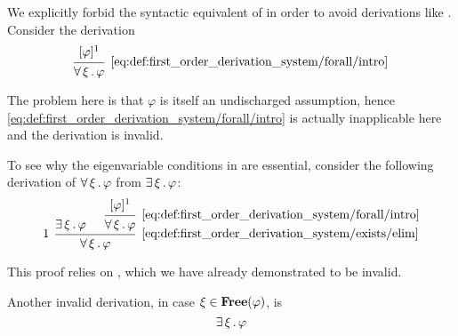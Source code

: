 \begin{example}\label{ex:def:first_order_derivation_system/eigenvariables}
  \hfill
  \begin{thmenum}
     We explicitly forbid the syntactic equivalent of  in order to avoid derivations like . Consider the derivation
    \begin{equation*}
      \begin{prooftree}
        \hypo{ [\varphi]^1 }
        \infer1[\ref{eq:def:first_order_derivation_system/forall/intro}]{ \qforall \xi \varphi }
      \end{prooftree}
    \end{equation*}

    The problem here is that \( \varphi \) is itself an undischarged assumption, hence \eqref{eq:def:first_order_derivation_system/forall/intro} is actually inapplicable here and the derivation is invalid.

     To see why the eigenvariable conditions in  are essential, consider the following derivation of \( \forall \thinspace \xi \thinspace . \thinspace \varphi \) from \( \exists \thinspace \xi \thinspace . \thinspace \varphi \):
    \begin{equation*}
      \begin{prooftree}
        \hypo{ \qexists \xi \varphi }

        \hypo{ [\varphi]^1 }
        \infer1[\ref{eq:def:first_order_derivation_system/forall/intro}]{ \qforall \xi \varphi }

        \infer[left label=\( 1 \)]2[\ref{eq:def:first_order_derivation_system/exists/elim}]{ \qforall \xi \varphi }
      \end{prooftree}
    \end{equation*}

    This proof relies on , which we have already demonstrated to be invalid.

     Another invalid derivation, in case \( \xi \in \operatorname{\mathbf{Free}}(\varphi) \), is
    \begin{equation*}
      \begin{prooftree}
        \hypo{ \qexists \xi \varphi }


\end{prooftree}
\end{equation*}
\end{thmenum}
\end{example}

